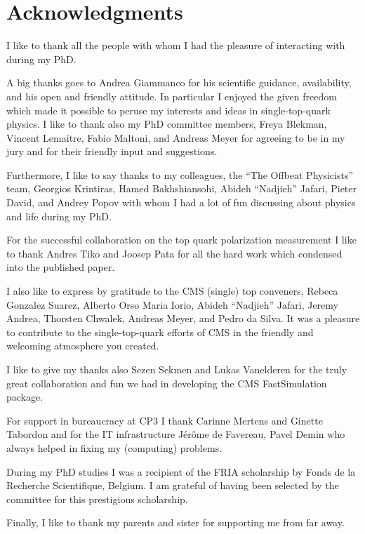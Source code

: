 \chapter*{Acknowledgments}

I like to thank all the people with whom I had the pleasure of interacting with during my PhD. 

A big thanks goes to Andrea Giammanco for his scientific guidance, availability, and his open and friendly attitude. In particular I enjoyed the given freedom which made it possible to peruse my interests and ideas in single-top-quark physics. I like to thank also my PhD committee members, Freya Blekman, Vincent Lemaitre, Fabio Maltoni, and Andreas Meyer for agreeing to be in my jury and for their friendly input and suggestions.

Furthermore, I like to say thanks to my colleagues, the ``The Offbeat Physicists'' team, Georgios Krintiras, Hamed Bakhshiansohi, Abideh ``Nadjieh'' Jafari, Pieter David, and Andrey Popov with whom I had a lot of fun discussing about physics and life during my PhD.

For the successful collaboration on the top quark polarization measurement I like to thank Andres Tiko and Joosep Pata for all the hard work which condensed into the published paper.

I also like to express by gratitude to the CMS (single) top conveners, Rebeca Gonzalez Suarez, Alberto Orso Maria Iorio, Abideh ``Nadjieh'' Jafari, Jeremy Andrea, Thorsten Chwalek, Andreas Meyer, and Pedro da Silva. It was a pleasure to contribute to the single-top-quark efforts of CMS in the friendly and welcoming atmosphere you created.

I like to give my thanks also Sezen Sekmen and Lukas Vanelderen for the truly great collaboration and fun we had in developing the CMS FastSimulation package.

For support in bureaucracy at CP3 I thank Carinne Mertens and Ginette Tabordon and for the IT infrastructure J\'er\^ome de Favereau, Pavel Demin who always helped in fixing my (computing) problems.

During my PhD studies I was a recipient of the FRIA scholarship by Fonds de la Recherche Scientifique, Belgium. I am grateful of having been selected by the committee for this prestigious scholarship.

Finally, I like to thank my parents and sister for supporting me from far away.
